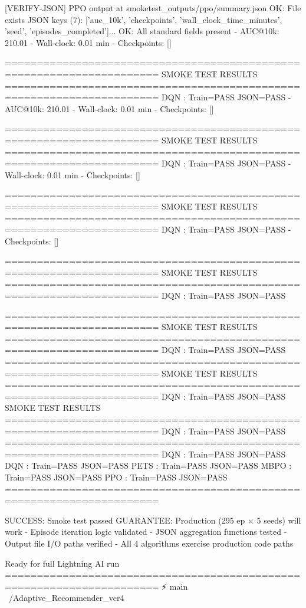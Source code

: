 [VERIFY-JSON] PPO output at smoketest_outputs/ppo/summary.json
   OK: File exists
   JSON keys (7): ['auc_10k', 'checkpoints', 'wall_clock_time_minutes', 'seed', 'episodes_completed']...
   OK: All standard fields present
   - AUC@10k: 210.01
   - Wall-clock: 0.01 min
   - Checkpoints: []

======================================================================
SMOKE TEST RESULTS
======================================================================
DQN   : Train=PASS  JSON=PASS
   - AUC@10k: 210.01
   - Wall-clock: 0.01 min
   - Checkpoints: []

======================================================================
SMOKE TEST RESULTS
======================================================================
DQN   : Train=PASS  JSON=PASS
   - Wall-clock: 0.01 min
   - Checkpoints: []

======================================================================
SMOKE TEST RESULTS
======================================================================
DQN   : Train=PASS  JSON=PASS
   - Checkpoints: []

======================================================================
SMOKE TEST RESULTS
======================================================================
DQN   : Train=PASS  JSON=PASS

======================================================================
SMOKE TEST RESULTS
======================================================================
DQN   : Train=PASS  JSON=PASS
======================================================================
SMOKE TEST RESULTS
======================================================================
DQN   : Train=PASS  JSON=PASS
SMOKE TEST RESULTS
======================================================================
DQN   : Train=PASS  JSON=PASS
======================================================================
DQN   : Train=PASS  JSON=PASS
DQN   : Train=PASS  JSON=PASS
PETS  : Train=PASS  JSON=PASS
MBPO  : Train=PASS  JSON=PASS
PPO   : Train=PASS  JSON=PASS
======================================================================

SUCCESS: Smoke test passed
GUARANTEE: Production (295 ep × 5 seeds) will work
  - Episode iteration logic validated
  - JSON aggregation functions tested
  - Output file I/O paths verified
  - All 4 algorithms exercise production code paths

Ready for full Lightning AI run
======================================================================
⚡ main ~/Adaptive_Recommender_ver4